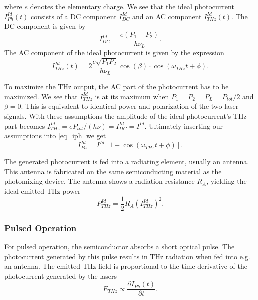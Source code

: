 where $e$ denotes the elementary charge.
We see that the ideal photocurrent $I_{Ph}^{Id}(t)$ consists of a DC component $I_{DC}^{Id}$ and an AC component $I_{THz}^{Id}(t)$.
The DC component is given by 
\begin{equation}
	I_{DC}^{Id} = \frac{e(P_1+P_2)}{h\nu_L}.
\end{equation} 
The AC component of the ideal photocurrent is given by the expression
\begin{equation}
	I_{THz}^{Id}(t) = 2\frac{e\sqrt{P_1P_2}}{h\nu_L}\cos(\beta)\cdot\cos(\omega_{THz}t + \phi).
\end{equation}

To maximize the THz output, the AC part of the photocurrent has to be maximized. We see that $I_{THz}^{Id}$ is at its maximum when $P_1 = P_2 = P_L = P_{tot} / 2$ and $\beta = 0$. This is equivalent to identical power and polarization of the two laser signals. With these assumptions the amplitude of the ideal photocurrent's THz part becomes $I_{THz}^{Id} = eP_{tot} / (h\nu) = I_{DC}^{Id} = I^{Id}$. Ultimately inserting our assumptions into \ref{eq_iph} we get 
\begin{equation}
	I_{Ph}^{Id} = I^{Id}[1 + \cos(\omega_{THz}t + \phi)].
	\label{eq8}
\end{equation}

The generated photocurrent is fed into a radiating element, usually an antenna. This antenna is fabricated on the same semiconducting material as the photomixing device. The antenna shows a radiation resistance $R_A$, yielding the ideal emitted THz power 
\begin{equation}
	P_{THz}^{Id}=\frac{1}{2}R_A (I_{THz}^{Id})^2.
	\label{eq_thz_pow}
\end{equation}

\subsubsection{Pulsed Operation}

For pulsed operation, the semiconductor absorbs a short optical pulse. The photocurrent generated by this pulse results in THz radiation when fed into e.g. an antenna. The emitted THz field is proportional to the time derivative of the photocurrent generated by the lasers \cite{preuTunableContinuouswaveTerahertz2011}
\begin{equation}
	E_{THz} \propto \frac{\partial I_{Ph}(t)}{\partial t}.
\label{eq1}
\end{equation}


